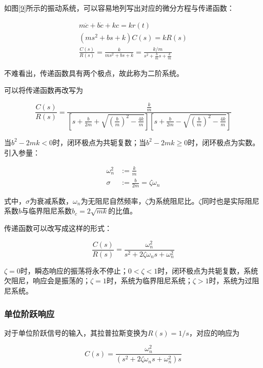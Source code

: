 如图\ref{9}所示的振动系统，可以容易地列写出对应的微分方程与传递函数：

\begin{gather*}
m\ddot c+b\dot c+kc=kr(t)\\
(ms^2+bs+k)C(s)=kR(s)\\
\frac{C(s)}{R(s)}=\frac{k}{ms^2+bs+k}=\frac{k/m}{s^2+\frac{b}{m}s+\frac{k}{m}}
\end{gather*}

不难看出，传递函数具有两个极点，故此称为二阶系统。

可以将传递函数再改写为

\begin{equation*}
\frac{C(s)}{R(s)}=\frac{\frac{k}{m}}{\left[s+\frac{b}{2m}+\sqrt{(\frac{b}{m})^2-\frac{4k}{m}}\right]\left[s+\frac{b}{2m}-\sqrt{(\frac{b}{m})^2-\frac{4k}{m}}\right]}
\end{equation*}

当$b^2-2mk<0$时，闭环极点为共轭复数；当$b^2-2mk\ge0$时，闭环极点为实数。引入参量：

\begin{align*}
\omega_n^2&:=\frac{k}{m}\\
\sigma&:=\frac{b}{2m}=\zeta\omega_n
\end{align*}

式中，$\sigma$为衰减系数，$\omega_n$为无阻尼自然频率，$\zeta$为系统阻尼比。$\zeta$同时也是实际阻尼系数$b$与临界阻尼系数$b_c=2\sqrt{mk}$的比值。

传递函数可以改写成这样的形式：

\begin{equation*}
\frac{C(s)}{R(s)}=\frac{\omega_n^2}{s^2+2\zeta\omega_ns+\omega_n^2}
\end{equation*}

$\zeta=0$时，瞬态响应的振荡将永不停止；$0<\zeta<1$时，闭环极点为共轭复数，系统欠阻尼，响应会是振荡的；$\zeta=1$时，系统为临界阻尼系统；$\zeta>1$时，系统为过阻尼系统。

\subsubsection{单位阶跃响应}

对于单位阶跃信号的输入，其拉普拉斯变换为$R(s)=1/s$，对应的响应为

\begin{equation*}
C(s)=\frac{\omega_n^2}{(s^2+2\zeta\omega_ns+\omega_n^2)s}
\end{equation*}


